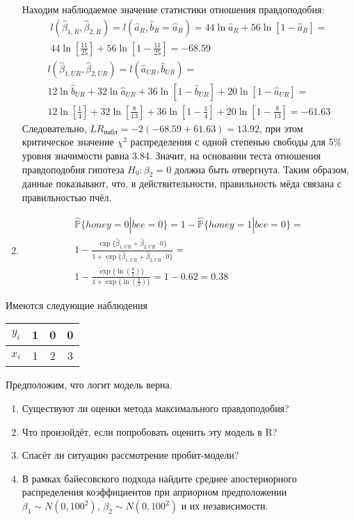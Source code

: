 \documentclass[pdftex,11pt,openany]{book}\usepackage[]{graphicx}\usepackage[]{color}
\begin{document}
\begin{solution}
\begin{enumerate}
Находим наблюдаемое значение статистики отношения правдоподобия:
\begin{multline}
l(\hat{\beta}_{1, R}, \hat{\beta}_{2, R}) = l(\hat{a}_R, \hat{b}_R = \hat{a}_R) = 44\ln\hat{a}_R + 56\ln[1-\hat{a}_R] =\\
 44\ln \left[ \frac{11}{25} \right] + 56\ln \left[ 1 - \frac{11}{25} \right] = -68.59
\end{multline}
\begin{multline}
l(\hat{\beta}_{1, UR}, \hat{\beta}_{2, UR}) = l(\hat{a}_{UR}, \hat{b}_{UR}) =\\
 12\ln \hat{b}_{UR} + 32 \ln \hat{a}_{UR} + 36\ln[1 - \hat{b}_{UR}] + 20\ln[1 - \hat{a}_{UR}] = \\
12\ln \left[ \frac{1}{4} \right] + 32\ln \left[ \frac{8}{13} \right] + 36\ln \left[ 1 - \frac{1}{4} \right] + 20\ln \left[1 - \frac{8}{13} \right] = -61.63
\end{multline}
Следовательно, $LR_{\text{набл}} = -2(-68.59 + 61.63) = 13.92$, при этом критическое значение $\chi^2$ распределения с одной степенью свободы для 5\% уровня значимости равна 3.84. Значит, на основании теста отношения правдоподобия гипотеза $H_0: \beta_2 = 0$ должна быть отвергнута. Таким образом, данные показывают, что, в действительности, правильность мёда связана с правильностью пчёл.

\item 
\begin{multline}
\hat{\mathbb{P}}\{honey = 0| bee = 0\} = 1 - \hat{\mathbb{P}}\{honey=1|bee=0\} = \\
1 - \frac{\exp\{\hat{\beta}_{1, UR} + \hat{\beta}_{2, UR} \cdot 0\}}{1 + \exp\{\hat{\beta}_{1, UR} + \hat{\beta}_{2, UR} \cdot 0\}} =\\
1 - \frac{\exp\{\ln\left( \frac{8}{5} \right)\}}{1 + \exp\{\ln\left( \frac{8}{5} \right)\}} = 1 - 0.62 = 0.38
\end{multline}
\end{enumerate}
\end{solution}


\begin{problem}
Имеются следующие наблюдения

\begin{tabular}{c|ccc}
$y_i$ & 1 & 0 & 0  \\
\hline
$x_i$ & 1 & 2 & 3 
\end{tabular}  

Предположим, что логит модель верна.

\begin{enumerate}
\item Существуют ли оценки метода максимального правдоподобия?
\item Что произойдёт, если попробовать оценить эту модель в R?
\item Спасёт ли ситуацию рассмотрение пробит-модели?
\item В рамках байесовского подхода найдите среднее апостериорного распределения коэффициентов при априорном предположении $\beta_1 \sim N(0, 100^2)$, $\beta_2 \sim N(0, 100^2)$ и их независимости.
\end{enumerate}

\end{problem}
\end{document}
